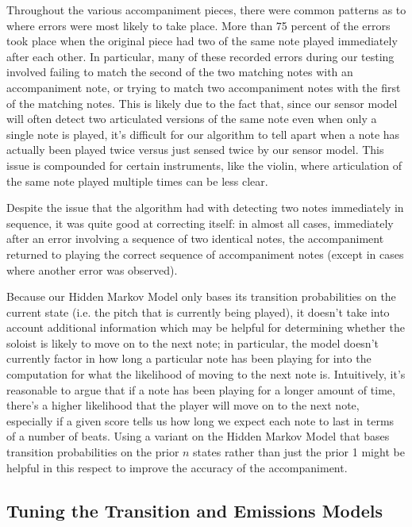 \documentclass[11pt]{article}
\begin{document}
Throughout the various accompaniment pieces, there were common patterns as to where
errors were most likely to take place.
More than 75 percent of the errors took place when the original piece had two of the
same note played immediately after each other.
In particular, many of these recorded errors during our testing involved failing to
match the second of the two matching notes with an accompaniment note, or trying to match
two accompaniment notes with the first of the matching notes. This is likely due to
the fact that, since our sensor model will often detect two articulated versions of
the same note even when only a single note is played, it's difficult for our algorithm
to tell apart when a note has actually been played twice versus just sensed twice
by our sensor model. This issue is compounded for certain instruments, like the violin,
where articulation of the same note played multiple times can be less clear.

Despite the issue that the algorithm had with detecting two notes immediately
in sequence, it was quite good at correcting itself: in almost all cases, immediately
after an error involving a sequence of two identical notes, the accompaniment
returned to playing the correct sequence of accompaniment notes (except in cases
where another error was observed).

Because our Hidden Markov Model only bases its transition probabilities
on the current state (i.e. the pitch that is currently being played), it doesn't
take into account additional information which may be helpful for determining
whether the soloist is likely to move on to the next note; in particular,
the model doesn't currently factor in how long a particular note has been playing for
into the computation for what the likelihood of moving to the next note is.
Intuitively, it's reasonable to argue that if a note has been playing for a longer
amount of time, there's a higher likelihood that the player will move on to the next note,
especially if a given score tells us how long we expect each note to last in terms
of a number of beats. Using a variant on the Hidden Markov Model that bases transition
probabilities on the prior $n$ states rather than just the prior 1 might be helpful
in this respect to improve the accuracy of the accompaniment.

\subsection{Tuning the Transition and Emissions Models}
\end{document}
